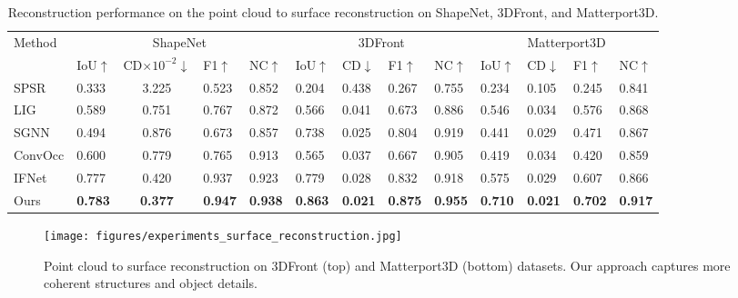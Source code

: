{
\begin{table*}[tp]
\begin{center}
\small
\begin{tabular}{|l|l|c|l|l|l|l|l|l|l|l|l|l|} 
\hline
\multirow{2}{*}{Method} & \multicolumn{4}{c|}{ShapeNet} & \multicolumn{4}{c|}{3DFront} & \multicolumn{4}{c|}{Matterport3D}  \\ 
\cline{2-13}
                        & IoU$\uparrow$ & CD$\times 10^{-2}$$\downarrow$ & F1$\uparrow$ & NC$\uparrow$     & IoU$\uparrow$ & CD$\downarrow$ & F1$\uparrow$ & NC$\uparrow$    & IoU$\uparrow$ & CD$\downarrow$ & F1$\uparrow$ & NC$\uparrow$ \\ 
\hline
SPSR                   & 0.333 & 3.225 & 0.523 & 0.852              & 0.204 & 0.438 & 0.267  & 0.755            & 0.234 & 0.105 & 0.245 & 0.841                  \\ 
LIG                   & 0.589 & 0.751 & 0.767 & 0.872              & 0.566 & 0.041 & 0.673 &  0.886            & 0.546 & 0.034 & 0.576 & 0.868                   \\ 
SGNN                    & 0.494 & 0.876 & 0.673 & 0.857                & 0.738 & 0.025& 0.804  & 0.919            & 0.441 & 0.029 & 0.471 & 0.867                   \\ 
ConvOcc                 & 0.600 & 0.779 & 0.765 & 0.913              & 0.565 & 0.037 & 0.667  & 0.905             & 0.419 & 0.034 & 0.420  & 0.859                    \\ 
IFNet                   & 0.777 & 0.420 & 0.937 & 0.923             & 0.779 & 0.028 & 0.832 & 0.918              & 0.575 & 0.029 & 0.607 & 0.866              \\ 
\hline
Ours                    & \textbf{0.783} & \textbf{0.377} & \textbf{0.947} & \textbf{0.938}               & \textbf{0.863} & \textbf{0.021} & \textbf{0.875} & \textbf{0.955}             & \textbf{0.710}  & \textbf{0.021} & \textbf{0.702}  & \textbf{0.917}                    \\
\hline
\end{tabular}
\caption{Reconstruction performance on the point cloud to surface reconstruction on ShapeNet, 3DFront, and Matterport3D.}
\label{tab:pcrecon}
\end{center}
\vspace{-0.50cm}
\end{table*}
}

\begin{figure*}
	\centering
	\texttt{[image: figures/experiments\_surface\_reconstruction.jpg]}
	\vspace{-0.6cm}
	\caption{
	    Point cloud to surface reconstruction on 3DFront (top) and Matterport3D (bottom) datasets.
	    Our approach captures more coherent structures and object details.
    }
	\label{fig:experiments_surface_reconstruction}
	\vspace{-0.25cm}
\end{figure*}

